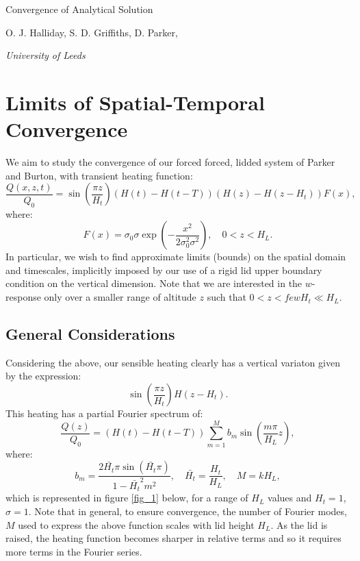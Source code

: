 \documentclass[12pt]{article}
\begin{document}
\begin{titlepage}

\vfill \LARGE
\begin{center}
Convergence of Analytical Solution
\large

\rule{0mm}{20mm}

O. J.  Halliday, S. D. Griffiths,  D. Parker,

 \vspace{3mm} {\em University of Leeds}





\end{center}

\pagestyle{empty}
\end{titlepage}
%
%
%
\section{Limits of Spatial-Temporal Convergence }
\label{sec_background}
%
We aim to study the convergence of our forced forced, lidded system of Parker and Burton, with transient heating function:
%
\begin{equation}
\frac{Q(x,z,t)}{Q_0}= \sin \left( \frac{\pi z }{ H_t} \right) ( H(t) - H(t-T)) ( H(z) - H(z-H_t)) F(x),
\end{equation}
%
where:
%
%
\begin{equation}
F(x) = \sigma_0 \sigma \exp \left( - \frac{x^2}{2 \sigma_0^2 \sigma^2 }\right), \quad 0<z<H_L.
\end{equation}
%
In particular, we wish to find approximate limits (bounds) on the spatial domain and timescales, implicitly imposed by our use of a rigid lid upper boundary condition
on the vertical dimension.  Note that we are interested in the $w$-response only over a smaller range of altitude $z$ such that $0<z< few H_t \ll H_L$. 
%
%
%
\subsection{General Considerations}
%
Considering the above, our sensible heating clearly has a vertical variaton given by the expression:
%
\begin{equation}
\sin\left( \frac{\pi z}{H_t}\right) H(z-H_t).
\end{equation}
%
This heating has a partial Fourier spectrum of:
%
\begin{equation}
\label{equ_partial}
\frac{Q(z)}{Q_0} =  ( H(t) - H(t-T))  \sum_{m=1}^M  b_m \sin \left( \frac{ m \pi }{ H_L} z \right) ,
\end{equation}
%
where:
%
\begin{equation}
 b_m =  \frac{2 \bar{H_t} \pi \sin \left( \bar{H_t} \pi \right) }{ 1 - \bar{H_t}^2 m^2 }, \quad \bar{H_t} = \frac{H_t}{H_L} , \quad M =k H_L,
\end{equation}
%
which is represented in figure \ref{fig_1} below, for a range of $H_L$ values and $H_t = 1$, $\sigma = 1$.  
Note that in general, to ensure convergence, the number of Fourier modes, $M$ used to express the above function scales with lid height $H_L$. 
As the lid is raised, the heating function becomes sharper in relative terms and so it requires more terms in the Fourier series.
\end{document}
